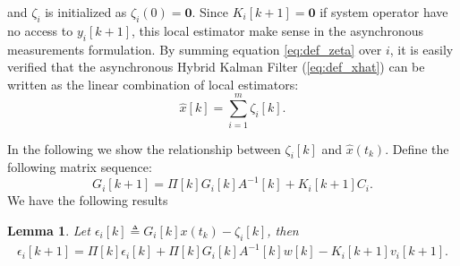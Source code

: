 \documentclass[12pt]{article}
\newcommand{\diag}{{\mathrm{diag}}}
\newtheorem{lemma}{\textbf{Lemma}}
\begin{document}
and $\zeta_{i}$ is initialized as $\zeta_{i}(0)= \mathbf{0}$.
Since $K_i[k+1]=\mathbf{0}$ if system operator have no access to $y_i[k+1]$, this local estimator make sense in the asynchronous measurements formulation.
By summing equation \eqref{eq:def_zeta} over $i$, it is easily verified that the asynchronous Hybrid Kalman Filter (\ref{eq:def_xhat}) can be written as the linear combination of local estimators:
\begin{equation}\label{eq:sum_zeta=xhat}
\hat{x}[k]= \sum_{i=1}^{m} \zeta_{i}[k] .
\end{equation}

In the following we show the relationship between $\zeta_{i}[k]$ and $\hat{x}(t_k)$. Define the following matrix sequence:
\begin{equation}\label{eq:defG}
	G_i[k+1]=\Pi[k] G_i[k] A^{-1}[k]+K_i[k+1]C_i.
\end{equation}
We have the following results
\begin{lemma}\label{lm:epsilon}
 Let $\epsilon_i[k]\triangleq G_i[k] x(t_k)-\zeta_{i}[k]$, then
	\begin{align}\label{eq:epsilon_recursive}
		\epsilon_i[k+1]=\Pi[k]\epsilon_i[k]+\Pi[k] G_i[k] A^{-1}[k] w[k]
		-K_i[k+1] v_{i}[k+1].
	\end{align}
\end{lemma}
\end{document}
